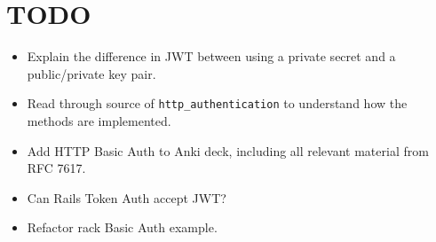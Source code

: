 \documentclass{article}
\begin{document}
\section{TODO}

\begin{itemize}
  \item Explain the difference in JWT between using a private secret and a
    public/private key pair.
  \item Read through source of \texttt{http\_authentication} to understand how
    the methods are implemented.
  \item Add HTTP Basic Auth to Anki deck, including all relevant material from
    RFC 7617.
  \item Can Rails Token Auth accept JWT?
  \item Refactor rack Basic Auth example.
\end{itemize}
\end{document}
